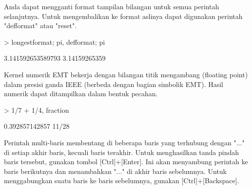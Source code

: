\documentclass[a4paper,10pt]{article}
\begin{document}
\begin{eulernotebook}
\begin{eulercomment}
\begin{eulercomment}
\begin{eulercomment}
Anda dapat mengganti format tampilan bilangan untuk semua perintah
selanjutnya. Untuk mengembalikan ke format aslinya dapat digunakan
perintah "defformat" atau "reset".
\end{eulercomment}
\begin{eulerprompt}
> longestformat; pi, defformat; pi
\end{eulerprompt}
\begin{euleroutput}
  3.141592653589793
  3.14159265359
\end{euleroutput}
\begin{eulercomment}
Kernel numerik EMT bekerja dengan bilangan titik mengambang (floating
point) dalam presisi ganda IEEE (berbeda dengan bagian simbolik EMT).
Hasil numerik dapat ditampilkan dalam bentuk pecahan.
\end{eulercomment}
\begin{eulerprompt}
> 1/7 + 1/4, fraction %
\end{eulerprompt}
\begin{euleroutput}
  0.392857142857
  11/28
\end{euleroutput}
\begin{eulercomment}
Perintah multi-baris membentang di beberapa baris yang terhubung
dengan "..." di setiap akhir baris, kecuali baris terakhir. Untuk
menghasilkan tanda pindah baris tersebut, gunakan tombol
[Ctrl]+[Enter]. Ini akan menyambung perintah ke baris berikutnya dan
menambahkan "..." di akhir baris sebelumnya. Untuk menggabungkan suatu
baris ke baris sebelumnya, gunakan [Ctrl]+[Backspace].


\end{eulercomment}
\end{eulercomment}
\end{eulercomment}
\end{eulernotebook}
\end{document}
